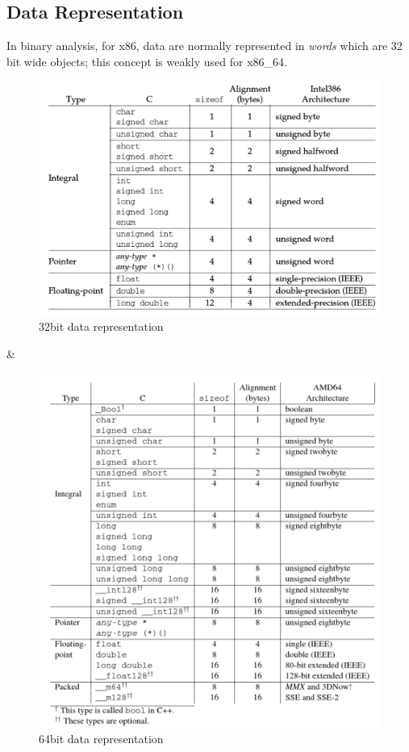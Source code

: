 \subsection{Data Representation}
In binary analysis, for x86, data are normally represented in \textit{words} which are 32 bit wide objects; this concept
is weakly used for x86\_64.
\begin{table}[htbp]
    \begin{center}
    \begin{tabular}[|c|c|]
    \begin{figure}
        \includegraphics[scale=0.4]{./pics/i386_data.png}
        \caption{32bit data representation}
        \label{32bit_word}
    \end{figure}
        &
    \begin{figure}
        \includegraphics[scale=0.4]{./pics/amd64_data.png}
        \caption{64bit data representation}
        \label{amd64_data}
    \end{figure}
    \end{tabular}
    \end{center}
\end{table}
